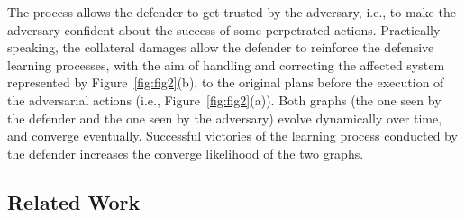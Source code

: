 \documentclass[letterpaper, 10pt, conference]{IEEEtran}
\begin{document}
The process allows the defender to get trusted by the adversary, i.e.,
to make the adversary confident about the success of some
perpetrated actions. Practically speaking, the collateral damages
allow the defender to reinforce the defensive learning processes,
with the aim of handling and correcting the affected system
represented by Figure~\ref{fig:fig2}(b), to the original plans before
the execution of the adversarial actions (i.e., Figure~\ref{fig:fig2}(a)). Both graphs (the one seen by the defender and the one seen by
the adversary) evolve dynamically over time, and converge
eventually. Successful victories of the learning process
conducted by the defender increases the converge likelihood
of the two graphs.

\subsection{Related Work}
\end{document}
